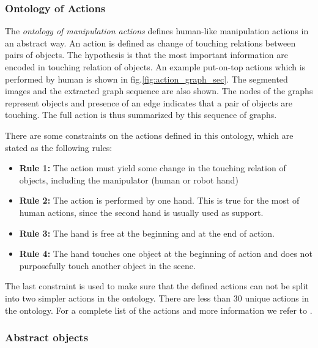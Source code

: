 \subsubsection{Ontology of Actions}
\label{sec:ontology}

The \textit{ontology of manipulation actions} \cite{TAMD13} defines human-like manipulation actions in an abstract way.
An action is defined as change of touching relations between pairs of objects.
The hypothesis is that the most important information are encoded in touching relation of objects.
An example put-on-top actions which is performed by human is shown in fig.\ref{fig:action_graph_sec}.
The segmented images and the extracted graph sequence are also shown.
The nodes of the graphs represent objects and presence of an edge indicates that a pair of objects are touching.
The full action is thus summarized by this sequence of graphs.

There are some constraints on the actions defined in this ontology, which are stated as the following rules:
\begin{itemize}
 \item \textbf{Rule 1:} The action must yield some change in the touching relation of objects, including the manipulator (human or robot hand)
 \item \textbf{Rule 2:} The action is performed by one hand. This is true for the most of human actions, since the second hand is usually used as support.
 \item \textbf{Rule 3:} The hand is free at the beginning and at the end of action.
 \item \textbf{Rule 4:} The hand touches one object at the beginning of action and does not purposefully touch another object in the scene.
\end{itemize}

The last constraint is used to make sure that the defined actions can not be split into two simpler actions in the ontology.
There are less than 30 unique actions in the ontology.
For a complete list of the actions and more information we refer to \cite{TAMD13}.

\subsubsection{Abstract objects}


